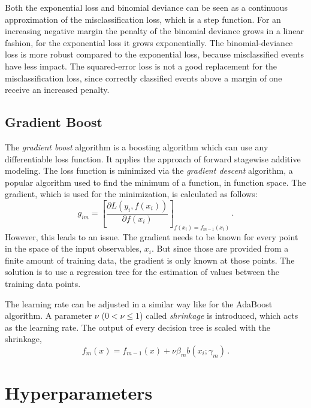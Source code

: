 Both the exponential loss and binomial deviance can be seen as a continuous approximation of the misclassification loss,
which is a step function.
For an increasing negative margin the penalty of the binomial deviance grows in a linear fashion, for the exponential loss
it grows exponentially.
The binomial-deviance loss is more robust compared to the exponential loss, because misclassified events have less impact.
The squared-error loss is not a good replacement for the misclassification loss, since correctly classified events
above a margin of one receive an increased penalty.

\subsection{Gradient Boost}\label{sub:bdt:boosting:gradient_boost}

The \emph{gradient boost} algorithm is a boosting algorithm which can use any differentiable loss function.
It applies the approach of forward stagewise additive modeling.
The loss function is minimized via the \emph{gradient descent} algorithm, a popular algorithm used to find the minimum
of a function, in function space.
The gradient, which is used for the minimization, is calculated as follows:
\begin{equation}
    g_{im} = {\left[ \frac{\partial L(y_i, f(x_i))}{\partial f(x_i)} \right]}_{f(x_i) = f_{m-1}(x_i)} \,.
\end{equation}
However, this leads to an issue.
The gradient needs to be known for every point in the space of the input observables, $x_i$.
But since those are provided from a finite amount of training data, the gradient is only known at those points.
The solution is to use a regression tree for the estimation of values between the training data points.

The learning rate can be adjusted in a similar way like for the AdaBoost algorithm.
A parameter $\nu$ ($0 < \nu \leq 1$) called \emph{shrinkage} is introduced, which acts as the learning rate.
The output of every decision tree is scaled with the shrinkage,
\begin{equation}
    f_m(x) = f_{m-1}(x) + \nu \beta_m b(x_i; \gamma_m) \,.
\end{equation}

\section{Hyperparameters}\label{sec:bdt:hyperparameters}

